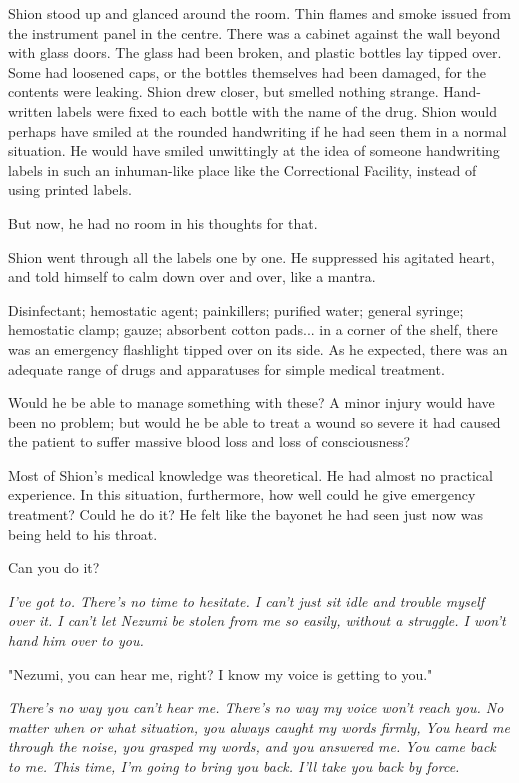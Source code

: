 Shion stood up and glanced around the room. Thin flames and smoke issued
from the instrument panel in the centre. There was a cabinet against the
wall beyond with glass doors. The glass had been broken, and plastic
bottles lay tipped over. Some had loosened caps, or the bottles
themselves had been damaged, for the contents were leaking. Shion drew
closer, but smelled nothing strange. Hand-written labels were fixed to
each bottle with the name of the drug. Shion would perhaps have smiled
at the rounded handwriting if he had seen them in a normal situation. He
would have smiled unwittingly at the idea of someone handwriting labels
in such an inhuman-like place like the Correctional Facility, instead of
using printed labels.

But now, he had no room in his thoughts for that.

Shion went through all the labels one by one. He suppressed his agitated
heart, and told himself to calm down over and over, like a mantra.

Disinfectant; hemostatic agent; painkillers; purified water; general
syringe; hemostatic clamp; gauze; absorbent cotton pads... in a corner
of the shelf, there was an emergency flashlight tipped over on its side.
As he expected, there was an adequate range of drugs and apparatuses for
simple medical treatment.

Would he be able to manage something with these? A minor injury would
have been no problem; but would he be able to treat a wound so severe it
had caused the patient to suffer massive blood loss and loss of
consciousness?

Most of Shion's medical knowledge was theoretical. He had almost no
practical experience. In this situation, furthermore, how well could he
give emergency treatment? Could he do it? He felt like the bayonet he
had seen just now was being held to his throat.

Can you do it?

\emph{I've got to. There's no time to hesitate. I can't just sit idle and
trouble myself over it. I can't let Nezumi be stolen from me so easily,
without a struggle. I won't hand him over to you.}

"Nezumi, you can hear me, right? I know my voice is getting to you."

\emph{There's no way you can't hear me. There's no way my voice won't reach
you. No matter when or what situation, you always caught my words
firmly, You heard me through the noise, you grasped my words, and you
answered me. You came back to me. This time, I'm going to bring you
back. I'll take you back by force.}

